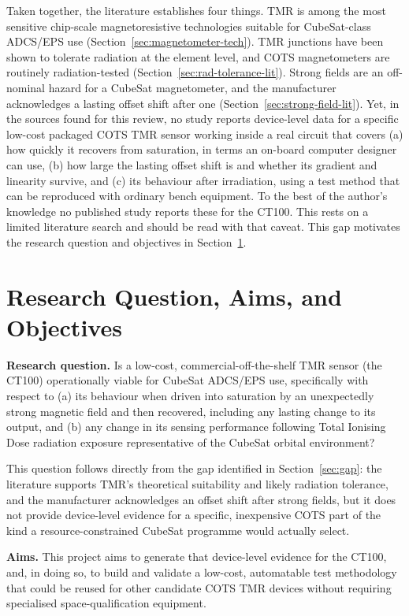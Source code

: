 \documentclass[12pt,a4paper]{article}
\begin{document}
Taken together, the literature establishes four things. TMR is among the most sensitive chip-scale magnetoresistive technologies suitable for CubeSat-class ADCS/EPS use (Section~\ref{sec:magnetometer-tech}). TMR junctions have been shown to tolerate radiation at the element level, and COTS magnetometers are routinely radiation-tested (Section~\ref{sec:rad-tolerance-lit}). Strong fields are an off-nominal hazard for a CubeSat magnetometer, and the manufacturer acknowledges a lasting offset shift after one (Section~\ref{sec:strong-field-lit}). Yet, in the sources found for this review, no study reports device-level data for a specific low-cost packaged COTS TMR sensor working inside a real circuit that covers (a) how quickly it recovers from saturation, in terms an on-board computer designer can use, (b) how large the lasting offset shift is and whether its gradient and linearity survive, and (c) its behaviour after irradiation, using a test method that can be reproduced with ordinary bench equipment. To the best of the author's knowledge no published study reports these for the CT100. This rests on a limited literature search and should be read with that caveat. This gap motivates the research question and objectives in Section~\ref{sec:research-question}.

\section{Research Question, Aims, and Objectives}
\label{sec:research-question}

\textbf{Research question.} Is a low-cost, commercial-off-the-shelf TMR sensor (the CT100) operationally viable for CubeSat ADCS/EPS use, specifically with respect to (a) its behaviour when driven into saturation by an unexpectedly strong magnetic field and then recovered, including any lasting change to its output, and (b) any change in its sensing performance following Total Ionising Dose radiation exposure representative of the CubeSat orbital environment?

This question follows directly from the gap identified in Section~\ref{sec:gap}: the literature supports TMR's theoretical suitability and likely radiation tolerance, and the manufacturer acknowledges an offset shift after strong fields, but it does not provide device-level evidence for a specific, inexpensive COTS part of the kind a resource-constrained CubeSat programme would actually select.

\textbf{Aims.} This project aims to generate that device-level evidence for the CT100, and, in doing so, to build and validate a low-cost, automatable test methodology that could be reused for other candidate COTS TMR devices without requiring specialised space-qualification equipment.
\end{document}
